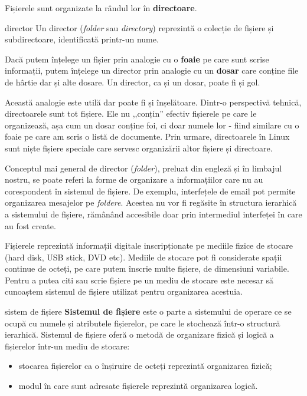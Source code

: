 Fișierele sunt organizate la rândul lor în \textbf{directoare}.

\begin{definition}{director}
Un director (\textit{folder} sau \textit{directory}) reprezintă o colecție de fișiere și subdirectoare, identificată printr-un nume.
\end{definition}

Dacă putem înțelege un fișier prin analogie cu o \textbf{foaie} pe care sunt scrise informații, putem înțelege un director prin analogie cu un \textbf{dosar} care conține file de hârtie dar și alte dosare.
Un director, ca și un dosar, poate fi și gol.

Această analogie este utilă dar poate fi și înșelătoare.
Dintr-o perspectivă tehnică, directoarele sunt tot fișiere.
Ele nu ,,conțin'' efectiv fișierele pe care le organizează, așa cum un dosar conține foi, ci doar numele lor - fiind similare cu o foaie pe care am scris o listă de documente.
Prin urmare, directoarele în Linux sunt niște fișiere speciale care servesc
organizării altor fișiere și directoare.

\begin{note}
Conceptul mai general de director (\textit{folder}), preluat din engleză și în limbajul nostru, se poate referi la forme de organizare a informațiilor care nu au corespondent în sistemul de fișiere.
De exemplu, interfețele de email pot permite organizarea mesajelor pe \textit{foldere}.
Acestea nu vor fi regăsite în structura ierarhică a sistemului de fișiere, rămânând accesibile doar prin intermediul interfeței în care au fost create.
\end{note}

Fișierele reprezintă informații digitale inscripționate pe mediile fizice de stocare (hard disk, USB stick, DVD etc).
Mediile de stocare pot fi considerate spații continue de octeți, pe care putem înscrie multe fișiere, de dimensiuni variabile.
Pentru a putea citi sau scrie fișiere pe un mediu de stocare este necesar să cunoaștem sistemul de fișiere utilizat pentru organizarea acestuia.

\begin{definition}{sistem de fișiere}
\textbf{Sistemul de fișiere} este o parte a sistemului de operare ce se ocupă cu numele și atributele fișierelor, pe care le stochează într-o structură ierarhică.
Sistemul de fișiere oferă o metodă de organizare fizică și logică a fișierelor într-un mediu de stocare:

\begin{itemize}
  \item stocarea fișierelor ca o înșiruire de octeți reprezintă organizarea fizică;
  \item modul în care sunt adresate fișierele reprezintă organizarea logică.
\end{itemize}
\end{definition}

